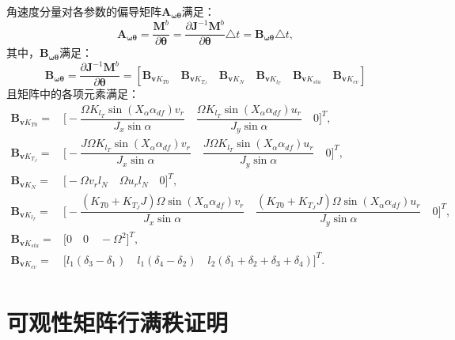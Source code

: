 角速度分量对各参数的偏导矩阵$\bm{A}_{\bm{\omega \theta}}$满足：
\begin{equation}
    \bm{A}_{\bm{\omega \theta}} = \frac{\bm{M}^b}{\partial \bm{\theta}} = \frac{\partial \bm{J}^{-1} \bm{M}^b}{\partial \bm{\theta}} \triangle t = \bm{B}_{\bm{\omega \theta}} \triangle t,
\end{equation}
其中，$\bm{B}_{\bm{\omega \theta}}$满足：
\begin{equation}
    \bm{B}_{\bm{\omega \theta}} = \frac{\partial \bm{J}^{-1} \bm{M}^b}{\partial \bm{\theta}} = [
        \bm{B}_{\bm{v}K_{T0}} \quad
        \bm{B}_{\bm{v}K_{T_J}} \quad
        \bm{B}_{\bm{v}K_{N}} \quad
        \bm{B}_{\bm{v}K_{l_T}} \quad
        \bm{B}_{\bm{v}K_{sta}} \quad
        \bm{B}_{\bm{v}K_{cv}}
    ]
\end{equation}
且矩阵中的各项元素满足：
\begin{equation}
    \begin{aligned}
        \bm{B}_{\bm{v}K_{T0}} =& 
        \biggl[
            -\dfrac{\Omega K_{l_T} \sin(X_\alpha \alpha_{df}) v_r}{J_x \sin\alpha} \quad
            \dfrac{\Omega K_{l_T} \sin(X_\alpha \alpha_{df}) u_r}{J_y \sin\alpha} \quad
            0
        \biggr]^T, \\
        \bm{B}_{\bm{v}K_{T_J}} =& 
        \biggl[
            -\dfrac{J \Omega K_{l_T} \sin(X_\alpha \alpha_{df}) v_r}{J_x \sin\alpha} \quad
            \dfrac{J \Omega K_{l_T} \sin(X_\alpha \alpha_{df}) u_r}{J_y \sin\alpha} \quad
            0
        \biggr]^T, \\
        \bm{B}_{\bm{v}K_{N}} =& 
        \biggl[
            -\Omega v_r l_N \quad
            \Omega u_r l_N \quad
            0
        \biggr]^T, \\
        \bm{B}_{\bm{v}K_{l_T}} =& 
        \biggl[
            -\dfrac{(K_{T0} + K_{T_J}J) \Omega \sin(X_\alpha \alpha_{df}) v_r}{J_x \sin\alpha} \quad
            \dfrac{(K_{T0} + K_{T_J}J) \Omega \sin(X_\alpha \alpha_{df}) u_r}{J_y \sin\alpha} \quad
            0
        \biggr]^T, \\
        \bm{B}_{\bm{v}K_{sta}} =& \biggl[0 \quad 0 \quad -\Omega^2\biggr]^T, \\
        \bm{B}_{\bm{v}K_{cv}} =& \biggl[l_1 (\delta_3 - \delta_1) \quad l_1 (\delta_4 - \delta_2) \quad l_2 (\delta_1 + \delta_2 + \delta_3 + \delta_4)\biggr]^T. \\
    \end{aligned}
\end{equation}

\section{可观性矩阵行满秩证明}
\label{appendix:full_rank}
